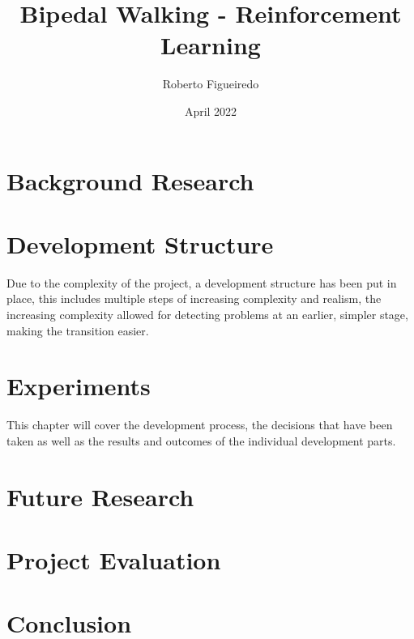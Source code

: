 \documentclass[12pt, a4paper]{report}
\title{Bipedal Walking - Reinforcement Learning}
\author{Roberto Figueiredo}
\date{April 2022}
\begin{document}
\begin{titlepage}
    \maketitle 
    \thispagestyle{empty}
\end{titlepage}





\pagebreak
\tableofcontents
\pagebreak





\chapter{Background Research}
    

\chapter{Development Structure}
    Due to the complexity of the project, a development structure has been put in place, 
    this includes multiple steps of increasing complexity and realism, 
    the increasing complexity allowed for detecting problems at an earlier, simpler stage, making the transition easier.

    
    

\chapter{Experiments} %
This chapter will cover the development process, the decisions that have been taken as well as the results and outcomes of the individual development parts. %
    

\chapter{Future Research}
    

\chapter{Project Evaluation}
    

\chapter{Conclusion}
    








\end{document}

